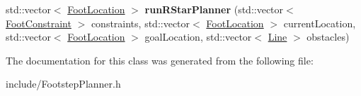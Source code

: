 \begin{DoxyCompactItemize}
\item 
\hypertarget{classfsp_1_1_footstep_planner_afb613c9a1931d6dcd8c4dd702a3ead85}{std\-::vector$<$ \hyperlink{classfsp_1_1_foot_location}{Foot\-Location} $>$ {\bfseries run\-R\-Star\-Planner} (std\-::vector$<$ \hyperlink{classfsp_1_1_foot_constraint}{Foot\-Constraint} $>$ constraints, std\-::vector$<$ \hyperlink{classfsp_1_1_foot_location}{Foot\-Location} $>$ current\-Location, std\-::vector$<$ \hyperlink{classfsp_1_1_foot_location}{Foot\-Location} $>$ goal\-Location, std\-::vector$<$ \hyperlink{classfsp_1_1_line}{Line} $>$ obstacles)}\label{classfsp_1_1_footstep_planner_afb613c9a1931d6dcd8c4dd702a3ead85}

\end{DoxyCompactItemize}


The documentation for this class was generated from the following file\-:\begin{DoxyCompactItemize}
\item 
include/Footstep\-Planner.\-h\end{DoxyCompactItemize}

